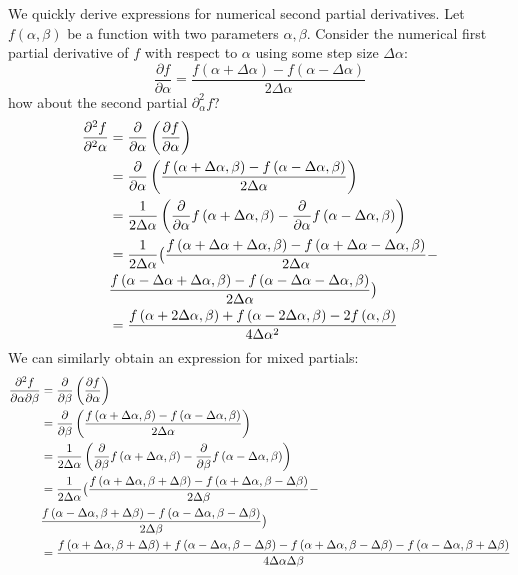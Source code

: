 \documentclass[12pt]{article}
\newcommand{\pth}[1]{\left(#1\right)}
\newcommand{\del}{\partial}
\begin{document}
We quickly derive expressions for numerical second partial derivatives. Let $f\pth{\alpha, \beta}$ be a function with two parameters $\alpha, \beta$. Consider the numerical first partial derivative of $f$ with respect to $\alpha$ using some step size $\Delta \alpha$:  
%
\[
    \frac{\partial f}{\partial \alpha} = \frac{f\pth{\alpha + \Delta \alpha} - f\pth{\alpha - \Delta \alpha}}{2 \Delta \alpha}
\]
%
how about the second partial $\partial^2_{\alpha} f$? 
%
\begin{align*}
    \frac{\del^2 f}{\del^2 \alpha} &= \frac{\del}{\del \alpha}\pth{ \frac{\del f}{\del \alpha}  } \\ 
    &= \frac{\del}{\del \alpha} \pth{\frac{f\pth{\alpha + \Delta \alpha, \beta } - f\pth{\alpha - \Delta \alpha, \beta}}{2 \Delta \alpha}} \\
    &= {1 \over 2\Delta \alpha} \pth{\frac{\del}{\del \alpha} f\pth{\alpha + \Delta \alpha, \beta } - \frac{\del}{\del \alpha} f\pth{\alpha - \Delta \alpha, \beta } } \\
    &=  {1 \over 2\Delta \alpha} \bigl (
    {f\pth{\alpha + \Delta \alpha + \Delta \alpha, \beta } - f\pth{\alpha + \Delta \alpha - \Delta \alpha, \beta } \over 2 \Delta \alpha}     
    -  \\
    &{f\pth{\alpha - \Delta \alpha + \Delta \alpha, \beta } - f\pth{\alpha - \Delta \alpha - \Delta \alpha, \beta} \over 2 \Delta \alpha}  \bigr )
    \\
    &=  {f\pth{\alpha + 2 \Delta \alpha, \beta } + f \pth{\alpha - 2 \Delta \alpha, \beta } - 2 f\pth{\alpha, \beta} \over 4 \Delta \alpha^2}
\end{align*}
%
We can similarly obtain an expression for mixed partials: 
%
\begin{align*}
    \frac{\del^2 f}{\del \alpha \del \beta} &= \frac{\del}{\del \beta}\pth{ \frac{\del f}{\del \alpha}  } \\ 
    &= \frac{\del}{\del \beta} \pth{\frac{f\pth{\alpha + \Delta \alpha, \beta } - f\pth{\alpha - \Delta \alpha, \beta}}{2 \Delta \alpha}} \\
    &= {1 \over 2\Delta \alpha} \pth{\frac{\del}{\del \beta} f\pth{\alpha + \Delta \alpha, \beta } - \frac{\del}{\del \beta} f\pth{\alpha - \Delta \alpha, \beta } } \\
    &=  {1 \over 2\Delta \alpha} \bigl (
    {f\pth{\alpha + \Delta \alpha , \beta + \Delta \beta} - f\pth{\alpha + \Delta \alpha , \beta  - \Delta \beta} \over 2 \Delta \beta}     
    -  \\
    &{f\pth{\alpha - \Delta \alpha , \beta + \Delta \beta } - f\pth{\alpha - \Delta \alpha, \beta - \Delta \beta} \over 2 \Delta \beta}  \bigr )
    \\
    &=  {f \pth{\alpha + \Delta \alpha , \beta + \Delta \beta} + f\pth{\alpha - \Delta \alpha, \beta - \Delta \beta} - f\pth{\alpha + \Delta \alpha , \beta  - \Delta \beta} - f\pth{\alpha - \Delta \alpha , \beta + \Delta \beta } \over 4 \Delta \alpha \Delta \beta}
\end{align*}
\end{document}
